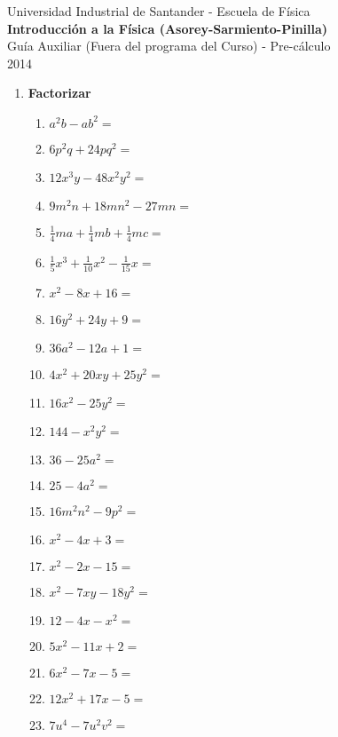 \documentclass[a4paper,12pt]{article}
\begin{document}
\begin{center}
  {\small{Universidad Industrial de Santander - Escuela de Física}}\\
  {\bf{Introducción a la Física (Asorey-Sarmiento-Pinilla)}}\\
  \vspace{0.4cm}
  Guía Auxiliar (Fuera del programa del Curso) - Pre-cálculo \\ 2014
\end{center}

\renewcommand{\labelenumi}{\arabic{enumi})}
\renewcommand{\labelenumii}{\arabic{enumii})}


\begin{enumerate}
  \item {\bf{Factorizar}} %
    \begin{enumerate}
      \item $a^2b - ab^2 = $
      \item $6p^2q + 24pq^2 = $
      \item $12x^3y - 48x^2y^2 = $
      \item $9m^2n + 18 mn^2 - 27mn= $
      \item $\frac14 ma + \frac14 mb + \frac14 mc = $
      \item $\frac15 x^3 + \frac{1}{10}x^2-\frac{1}{15}x = $
      \item $ x^2 - 8 x + 16 = $
      \item $ 16y^2 + 24 y + 9 = $
      \item $ 36a^2 - 12a + 1 = $
      \item $4x^2 + 20xy + 25y^2 = $
      \item $16x^2 - 25y^2 = $
      \item $144 - x^2y^2 = $
      \item $36 - 25a^2 = $
      \item $25 - 4a^2 = $
      \item $16m^2n^2 - 9p^2 = $
      \item $x^2 - 4x + 3 = $
      \item $x^2 - 2x - 15 = $
      \item $x^2 - 7xy - 18y^2 = $ 
      \item $12 - 4x - x^2 = $
      \item $5x^2 - 11x + 2 = $
      \item $6x^2 - 7x - 5 = $
      \item $12x^2 + 17x - 5 = $
      \item $7u^4 - 7u^2v^2 = $

\end{enumerate}
\end{enumerate}
\end{document}
